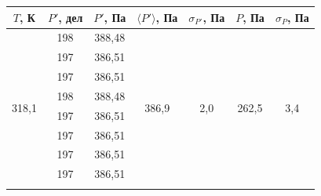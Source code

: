 \documentclass[a4paper, 12pt]{article}
\begin{document}
        \begin{table}[H]
    	\centering
    	\begin{tabular}{ccccccc}
                \hline
                \multicolumn{1}{|c|}{$ T $, К} &
    		\multicolumn{1}{c|}{$ P' $, дел} &
    		\multicolumn{1}{c|}{$ P' $, Па} &
    		\multicolumn{1}{c|}{$ \langle P' \rangle $, Па} &
    		\multicolumn{1}{c|}{$ \sigma_{P'} $, Па} &
    		\multicolumn{1}{c|}{$ P $, Па} &
    		\multicolumn{1}{c|}{$ \sigma_P $, Па} \\ \hline
                \multicolumn{1}{|c|}{\multirow{10}{*}{318,1}} & \multicolumn{1}{c|}{198} & \multicolumn{1}{c|}{388,48} & \multicolumn{1}{c|}{\multirow{10}{*}{386,9}} & \multicolumn{1}{c|}{\multirow{10}{*}{2,0}} & \multicolumn{1}{c|}{\multirow{10}{*}{262,5}} & \multicolumn{1}{c|}{\multirow{10}{*}{3,4}} \\ \cline{2-3}
                \multicolumn{1}{|c|}{} & \multicolumn{1}{c|}{197} & \multicolumn{1}{c|}{386,51} & \multicolumn{1}{c|}{} & \multicolumn{1}{c|}{} & \multicolumn{1}{c|}{} & \multicolumn{1}{c|}{} \\ \cline{2-3}
                \multicolumn{1}{|c|}{} & \multicolumn{1}{c|}{197} & \multicolumn{1}{c|}{386,51} & \multicolumn{1}{c|}{} & \multicolumn{1}{c|}{} & \multicolumn{1}{c|}{} & \multicolumn{1}{c|}{} \\ \cline{2-3}
                \multicolumn{1}{|c|}{} & \multicolumn{1}{c|}{198} & \multicolumn{1}{c|}{388,48} & \multicolumn{1}{c|}{} & \multicolumn{1}{c|}{} & \multicolumn{1}{c|}{} & \multicolumn{1}{c|}{} \\ \cline{2-3}
                \multicolumn{1}{|c|}{} & \multicolumn{1}{c|}{197} & \multicolumn{1}{c|}{386,51} & \multicolumn{1}{c|}{} & \multicolumn{1}{c|}{} & \multicolumn{1}{c|}{} & \multicolumn{1}{c|}{} \\ \cline{2-3}
                \multicolumn{1}{|c|}{} & \multicolumn{1}{c|}{197} & \multicolumn{1}{c|}{386,51} & \multicolumn{1}{c|}{} & \multicolumn{1}{c|}{} & \multicolumn{1}{c|}{} & \multicolumn{1}{c|}{} \\ \cline{2-3}
                \multicolumn{1}{|c|}{} & \multicolumn{1}{c|}{197} & \multicolumn{1}{c|}{386,51} & \multicolumn{1}{c|}{} & \multicolumn{1}{c|}{} & \multicolumn{1}{c|}{} & \multicolumn{1}{c|}{} \\ \cline{2-3}
                \multicolumn{1}{|c|}{} & \multicolumn{1}{c|}{197} & \multicolumn{1}{c|}{386,51} & \multicolumn{1}{c|}{} & \multicolumn{1}{c|}{} & \multicolumn{1}{c|}{} & \multicolumn{1}{c|}{} \\ \cline{2-3}

\end{tabular}
\end{table}
\end{document}
